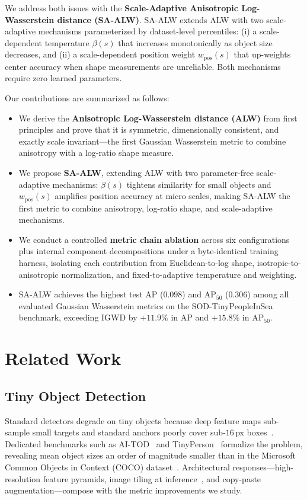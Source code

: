 \documentclass[runningheads]{llncs}
\begin{document}
We address both issues with the \textbf{Scale-Adaptive Anisotropic
Log-Wasserstein distance (SA-ALW)}. SA-ALW extends ALW with two scale-adaptive
mechanisms parameterized by dataset-level percentiles: (i) a scale-dependent
temperature $\beta(s)$ that increases monotonically as object size decreases,
and (ii) a scale-dependent position weight $w_{\text{pos}}(s)$ that
up-weights center accuracy when shape measurements are unreliable. Both
mechanisms require zero learned parameters.

Our contributions are summarized as follows:
\begin{itemize}
  \item We derive the \textbf{Anisotropic Log-Wasserstein distance (ALW)}
  from first principles and prove that it is symmetric, dimensionally
  consistent, and exactly scale invariant---the first Gaussian Wasserstein
  metric to combine anisotropy with a log-ratio shape measure.
  \item We propose \textbf{SA-ALW}, extending ALW with two parameter-free
  scale-adaptive mechanisms: $\beta(s)$ tightens similarity for small
  objects and $w_{\text{pos}}(s)$ amplifies position accuracy at micro
  scales, making SA-ALW the first metric to combine anisotropy, log-ratio
  shape, and scale-adaptive mechanisms.
  \item We conduct a controlled \textbf{metric chain ablation} across six
  configurations plus internal component decompositions under a
  byte-identical training harness, isolating each contribution from
  Euclidean-to-log shape, isotropic-to-anisotropic normalization, and
  fixed-to-adaptive temperature and weighting.
  \item SA-ALW achieves the highest test AP ($0.098$) and AP$_{50}$
  ($0.306$) among all evaluated Gaussian Wasserstein metrics on the
  SOD-TinyPeopleInSea benchmark, exceeding IGWD by $+11.9\%$ in AP and
  $+15.8\%$ in AP$_{50}$.
\end{itemize}

\section{Related Work}
\label{sec:related}

\subsection{Tiny Object Detection}
Standard detectors degrade on tiny objects because deep feature maps
sub-sample small targets and standard anchors poorly cover sub-$16$\,px
boxes~\cite{wang2021aitod}. Dedicated benchmarks such as
AI-TOD~\cite{wang2021aitod,xu2022aitodv2nwd} and
TinyPerson~\cite{yu2020tinyperson} formalize the problem, revealing mean
object sizes an order of magnitude smaller than in the Microsoft Common
Objects in Context (COCO) dataset~\cite{lin2014coco}. Architectural
responses—high-resolution feature pyramids, image tiling at
inference~\cite{akyon2022sahi}, and copy-paste augmentation—compose with the
metric improvements we study.
\end{document}
